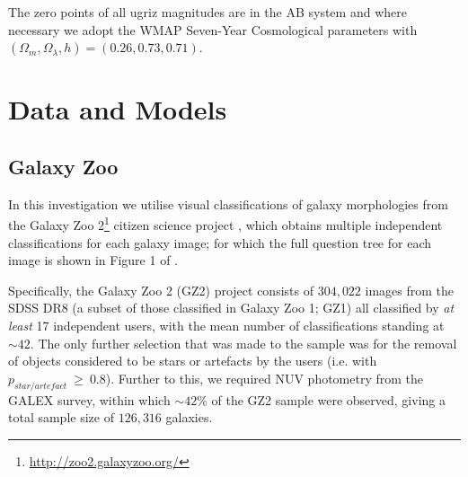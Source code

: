 \documentclass{mn2e}
\begin{document}
The zero points of all ugriz magnitudes are in the AB system and where necessary we adopt the WMAP Seven-Year Cosmological parameters \citep{WMAP} with $(\Omega_m, \Omega_{\lambda}, h) = (0.26, 0.73, 0.71)$. 

\section{Data and Models}

\subsection{Galaxy Zoo}
In this investigation we utilise visual classifications of galaxy morphologies from the Galaxy Zoo 2\footnote{\url{http://zoo2.galaxyzoo.org/}} citizen science project \citep{GZ2}, which obtains multiple independent classifications for each galaxy image; for which the full question tree for each image is shown in Figure 1 of \citet{GZ2}.  

Specifically, the Galaxy Zoo 2 (GZ2) project consists of $304, 022$ images from the SDSS DR8 (a subset of those classified in Galaxy Zoo 1; GZ1) all classified by \emph{at least} 17 independent users, with the mean number of classifications standing at $\sim42$.
The only further selection that was made to the sample was for the removal of  objects considered to be stars or artefacts by the users (i.e. with $p_{star/artefact} ~\geq~ 0.8$). Further to this, we required NUV photometry from the GALEX survey, within which $\sim42\%$ of the GZ2 sample were observed, giving a total sample size of $126, 316$ galaxies. 

\end{document}
